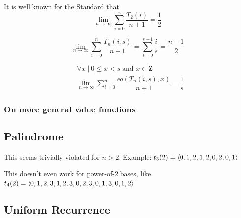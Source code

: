 \documentclass[conference]{IEEEtran}
\begin{document}
It is well known \cite{Cai_2020} for the Standard \TMS that
\begin{equation}
    \lim_{n\to\infty} \sum_{i=0}^n \dfrac{T_{2}(i)}{n+1} = \dfrac{1}{2}
\end{equation}


\begin{equation}
    \lim_{n\to\infty} \sum_{i=0}^n\dfrac{T_{n}(i, s)}{n+1} = \sum_{i=0}^{s-1}\dfrac{i}{s} = \dfrac{n-1}{2}
\end{equation}


\begin{equation}
\begin{aligned}
    &\forall{x} \;|\; 0 \le x < s \text{ and } x \in \mathbf{Z} \\
    &\lim_{n\to\infty} \sum_{i=0}^n\dfrac{eq\left(T_{n}(i, s), x\right)}{n+1} = \dfrac{1}{s}
\end{aligned}
\end{equation}

\subsubsection{On more general value functions}

\subsection{Palindrome}

This seems trivially violated for $n > 2$. Example: $t_3(2) = \langle 0, 1, 2, 1, 2, 0, 2, 0, 1 \rangle$

This doesn't even work for power-of-2 bases, like $t_4(2) = \langle 0, 1, 2, 3, 1, 2, 3, 0, 2, 3, 0, 1, 3, 0, 1, 2 \rangle$


\subsection{Uniform Recurrence}

\end{document}
